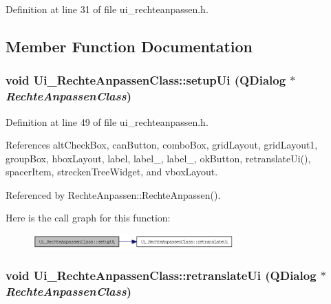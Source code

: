 Definition at line 31 of file ui\_\-rechteanpassen.h.

\subsection{Member Function Documentation}
\hypertarget{class_ui___rechte_anpassen_class_018e703043acba210693fe35356e9ca2}{
\subsubsection[setupUi]{\setlength{\rightskip}{0pt plus 5cm}void Ui\_\-RechteAnpassenClass::setupUi (QDialog $\ast$ {\em RechteAnpassenClass})}}
\label{class_ui___rechte_anpassen_class_018e703043acba210693fe35356e9ca2}




Definition at line 49 of file ui\_\-rechteanpassen.h.

References altCheckBox, canButton, comboBox, gridLayout, gridLayout1, groupBox, hboxLayout, label, label\_, label\_, okButton, retranslateUi(), spacerItem, streckenTreeWidget, and vboxLayout.

Referenced by RechteAnpassen::RechteAnpassen().

Here is the call graph for this function:\nopagebreak
\begin{figure}[H]
\begin{center}
\leavevmode
\includegraphics[width=219pt]{class_ui___rechte_anpassen_class_018e703043acba210693fe35356e9ca2_cgraph}
\end{center}
\end{figure}
\hypertarget{class_ui___rechte_anpassen_class_4b57f6acd3eedec7366c62a8f11ec15b}{
\subsubsection[retranslateUi]{\setlength{\rightskip}{0pt plus 5cm}void Ui\_\-RechteAnpassenClass::retranslateUi (QDialog $\ast$ {\em RechteAnpassenClass})}}
\label{class_ui___rechte_anpassen_class_4b57f6acd3eedec7366c62a8f11ec15b}




